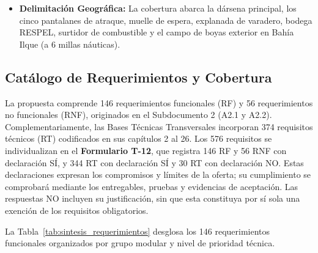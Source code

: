 \begin{itemize}
\begin{enumerate}[label=(\alph*)]
        \item \emph{Uso de Radio VHF (RST-INS-03):} La comunicación VHF continúa como medio primario durante maniobras de atraque e izaje; el sistema no impone digitación manual en momentos de riesgo físico.
    \end{enumerate}
    \item \textbf{Delimitación Geográfica:} La cobertura abarca la dársena principal, los cinco pantalanes de atraque, muelle de espera, explanada de varadero, bodega RESPEL, surtidor de combustible y el campo de boyas exterior en Bahía Ilque (a 6 millas náuticas).
\end{itemize}

\subsection{Catálogo de Requerimientos y Cobertura}

La propuesta comprende 146 requerimientos funcionales (RF) y 56 requerimientos no funcionales (RNF), originados en el Subdocumento 2 (A2.1 y A2.2). Complementariamente, las Bases Técnicas Transversales incorporan 374 requisitos técnicos (RT) codificados en sus capítulos 2 al 26. Los 576 requisitos se individualizan en el \textbf{Formulario T-12}, que registra 146 RF y 56 RNF con declaración SÍ, y 344 RT con declaración SÍ y 30 RT con declaración NO. Estas declaraciones expresan los compromisos y límites de la oferta; su cumplimiento se comprobará mediante los entregables, pruebas y evidencias de aceptación. Las respuestas NO incluyen su justificación, sin que esta constituya por sí sola una exención de los requisitos obligatorios.

La Tabla~\ref{tab:sintesis_requerimientos} desglosa los 146 requerimientos funcionales organizados por grupo modular y nivel de prioridad técnica.

